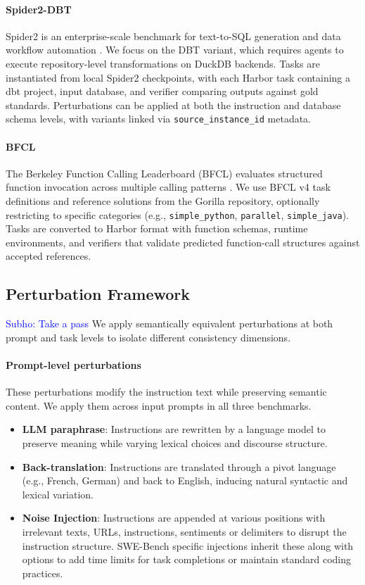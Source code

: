 \documentclass{article}
\newcommand{\sm}[1]{\textcolor{blue}{Subho: #1}}
\theoremstyle{plain}
\theoremstyle{definition}
\theoremstyle{remark}
\begin{document}
\paragraph{Spider2-DBT}
Spider2 is an enterprise-scale benchmark for text-to-SQL generation and data workflow automation \cite{lei2024spider}. We focus on the DBT variant, which requires agents to execute repository-level transformations on DuckDB backends. Tasks are instantiated from local Spider2 checkpoints, with each Harbor task containing a dbt project, input database, and verifier comparing outputs against gold standards. Perturbations can be applied at both the instruction and database schema levels, with variants linked via \texttt{source\_instance\_id} metadata.

\paragraph{BFCL}
The Berkeley Function Calling Leaderboard (BFCL) evaluates structured function invocation across multiple calling patterns \cite{patil2024bfcl}. We use BFCL v4 task definitions and reference solutions from the Gorilla repository, optionally restricting to specific categories (e.g., \texttt{simple\_python}, \texttt{parallel}, \texttt{simple\_java}). Tasks are converted to Harbor format with function schemas, runtime environments, and verifiers that validate predicted function-call structures against accepted references.

\subsection{Perturbation Framework}

\sm{Take a pass}
We apply semantically equivalent perturbations at both prompt and task levels to isolate different consistency dimensions.

\paragraph{Prompt-level perturbations}
These perturbations modify the instruction text while preserving semantic content. We apply them across input prompts in all three benchmarks.

\begin{itemize}[nolistsep,leftmargin=*]
    \item \textbf{LLM paraphrase}: Instructions are rewritten by a language model to preserve meaning while varying lexical choices and discourse structure.
    \item \textbf{Back-translation}: Instructions are translated through a pivot language (e.g., French, German) and back to English, inducing natural syntactic and lexical variation.
    \item \textbf{Noise Injection}: Instructions are appended at various positions with irrelevant texts, URLs, instructions, sentiments or delimiters to disrupt the instruction structure. SWE-Bench specific injections inherit these along with options to add time limits for task completions or maintain standard coding practices.
\end{itemize}
\end{document}
